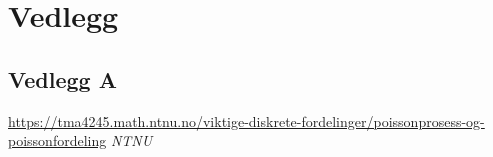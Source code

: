 \documentclass[12pt]{article}
\begin{document}
\newpage
\section*{Vedlegg}
\subsection*{Vedlegg A}

\newpage
\begin{thebibliography}{9}

  \url{https://tma4245.math.ntnu.no/viktige-diskrete-fordelinger/poissonprosess-og-poissonfordeling}
  \textit{NTNU}
\end{thebibliography}
\end{document}
